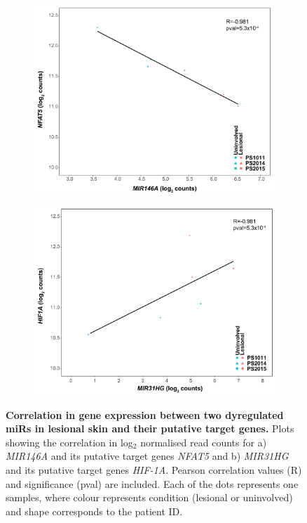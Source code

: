 \begin{figure}[htbp]
\centering
\begin{subfigure}{0.45\textwidth}
\centering
\includegraphics[width=\textwidth]{./Results2/pdfs/Skin_RNAseq_correlation_MIR146A_NFAT5_plot}
\caption{\textbf{}}
\end{subfigure}%
\begin{subfigure}{0.45 \textwidth}
\centering
\includegraphics[width=\textwidth]{./Results2/pdfs/Skin_RNAseq_correlation_MIR31HG_HIF1A_plot}
\caption{\textbf{}}
\end{subfigure}
\caption[Correlation in gene expression between two dyregulated miRs in lesional skin and their putative target genes.]{\textbf{Correlation in gene expression between two dyregulated miRs in lesional skin and their putative target genes.} Plots showing the correlation in log$_2$ normalised read counts for a) \textit{MIR146A} and its putative target genes \textit{NFAT5} and b) \textit{MIR31HG} and its putative target genes \textit{HIF-1A}. Pearson correlation values (R) and significance (pval) are included. Each of the dots represents one samples, where colour represents condition (lesional or uninvolved) and shape corresponds to the patient ID.}
\label{figure:RNAseq_lesional_uninvolved_miR_correlations}
\end{figure}
